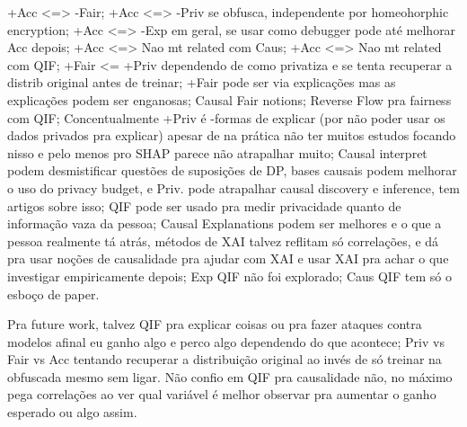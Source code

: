\documentclass{article}
\begin{document}
{\color{red} +Acc <=> -Fair; +Acc <=> -Priv se obfusca, independente por homeohorphic encryption; +Acc <=> -Exp em geral, se usar como debugger pode até melhorar Acc depois; +Acc <=> Nao mt related com Caus; +Acc <=> Nao mt related com QIF; +Fair <= +Priv dependendo de como privatiza e se tenta recuperar a distrib original antes de treinar; +Fair pode ser via explicações mas as explicações podem ser enganosas; Causal Fair notions; Reverse Flow pra fairness com QIF; Concentualmente +Priv é -formas de explicar (por não poder usar os dados privados pra explicar) apesar de na prática não ter muitos estudos focando nisso e pelo menos pro SHAP parece não atrapalhar muito; Causal interpret podem desmistificar questões de suposições de DP, bases causais podem melhorar o uso do privacy budget, e Priv. pode atrapalhar causal discovery e inference, tem artigos sobre isso; QIF pode ser usado pra medir privacidade quanto de informação vaza da pessoa; Causal Explanations podem ser melhores e o que a pessoa realmente tá atrás, métodos de XAI talvez reflitam só correlações, e dá pra usar noções de causalidade pra ajudar com XAI e usar XAI pra achar o que investigar empiricamente depois; Exp QIF não foi explorado; Caus QIF tem só o esboço de paper.}


{\color{red} Pra future work, talvez QIF pra explicar coisas ou pra fazer ataques contra modelos afinal eu ganho algo e perco algo dependendo do que acontece; Priv vs Fair vs Acc tentando recuperar a distribuição original ao invés de só treinar na obfuscada mesmo sem ligar. Não confio em QIF pra causalidade não, no máximo pega correlações ao ver qual variável é melhor observar pra aumentar o ganho esperado ou algo assim.}




\end{document}
